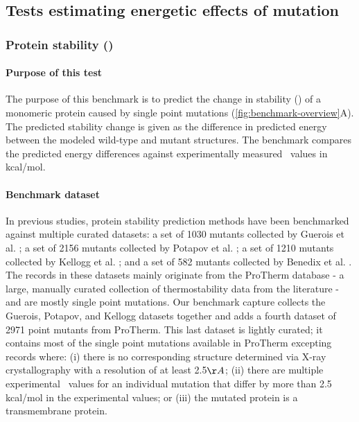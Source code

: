 \subsection{Tests estimating energetic effects of mutation}

\subsubsection{Protein stability (\ddg)}

\paragraph{Purpose of this test}

The purpose of this benchmark is to predict the change in stability (\ddg) of a monomeric protein caused by single point mutations (\cref{fig:benchmark-overview}A). The predicted stability change is given as the difference in predicted energy between the modeled wild-type and mutant structures. The benchmark compares the predicted energy differences against experimentally measured \ddg\ values in kcal/mol.

\paragraph{Benchmark dataset}

In previous studies, protein stability prediction methods have been benchmarked against multiple curated datasets: a set of 1030 mutants collected by Guerois et al. \cite{guerois_predicting_2002}; a set of 2156 mutants collected by Potapov et al. \cite{potapov_assessing_2009}; a set of 1210 mutants collected by Kellogg et al. \cite{kellogg_role_2011}; and a set of 582 mutants collected by Benedix et al. \cite{benedix_predicting_2009}. The records in these datasets mainly originate from the ProTherm database \cite{kumar_protherm_2006} - a large, manually curated collection of thermostability data from the literature - and are mostly single point mutations. Our benchmark capture collects the Guerois, Potapov, and Kellogg datasets together and adds a fourth dataset of 2971 point mutants from ProTherm. This last dataset is lightly curated; it contains most of the single point mutations available in ProTherm excepting records where: (i) there is no corresponding structure determined via X-ray crystallography with a resolution of at least 2.5$\AA$; (ii) there are multiple experimental \ddg\ values for an individual mutation that differ by more than 2.5 kcal/mol in the experimental values; or (iii) the mutated protein is a transmembrane protein.

